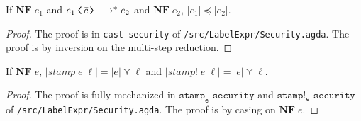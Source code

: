 \begin{lemma}
\label{lem:cast-lexpr-explicit}
If $\mathbf{NF}\;e_1$ and $\cccast{e_1}{\bar{c}} \longrightarrow^{*} e_2$ and $\mathbf{NF}\;e_2$,
$|e_1| \preccurlyeq |e_2|$.
\end{lemma}
\begin{proof}
The proof is in \texttt{cast-security} of \texttt{/src/LabelExpr/Security.agda}.
The proof is by inversion on the multi-step reduction.
\end{proof}

\begin{lemma}
\label{lem:stamp-lexpr-implicit}
If $\mathbf{NF}\;e$, $|\mathit{stamp}\;e\;\ell| = |e| \curlyvee \ell$ and
$|\mathit{stamp!}\;e\;\ell| = |e| \curlyvee \ell$.
\end{lemma}
\begin{proof}
The proof is fully mechanized in $\mathtt{stamp_e\texttt{-}security}$ and
$\mathtt{stamp!_e\texttt{-}security}$ of \texttt{/src/LabelExpr/Security.agda}.
The proof is by casing on $\mathbf{NF}\;e$.
\end{proof}

